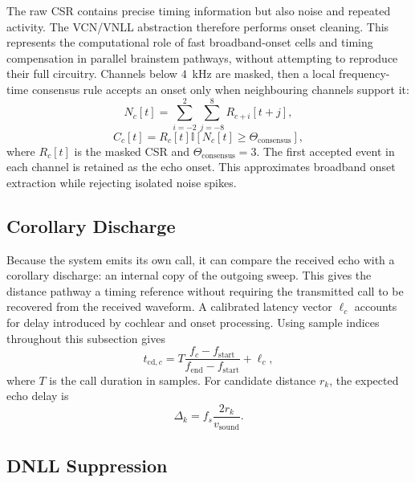 The raw CSR contains precise timing information but also noise and repeated activity. The VCN/VNLL abstraction therefore performs onset cleaning. This represents the computational role of fast broadband-onset cells and timing compensation in parallel brainstem pathways, without attempting to reproduce their full circuitry. Channels below $4$~kHz are masked, then a local frequency-time consensus rule accepts an onset only when neighbouring channels support it:
\begin{equation}
    N_c[t] = \sum_{i=-2}^{2}\sum_{j=-8}^{8} R_{c+i}[t+j],
\end{equation}
\begin{equation}
    C_c[t] = R_c[t]\mathbb{I}[N_c[t]\geq \Theta_{\mathrm{consensus}}],
\end{equation}
where $R_c[t]$ is the masked CSR and $\Theta_{\mathrm{consensus}}=3$. The first accepted event in each channel is retained as the echo onset. This approximates broadband onset extraction while rejecting isolated noise spikes.

\subsection{Corollary Discharge}

Because the system emits its own call, it can compare the received echo with a corollary discharge: an internal copy of the outgoing sweep. This gives the distance pathway a timing reference without requiring the transmitted call to be recovered from the received waveform. A calibrated latency vector $\ell_c$ accounts for delay introduced by cochlear and onset processing. Using sample indices throughout this subsection gives
\begin{equation}
    t_{\mathrm{cd},c}
    =
    T\frac{f_c-f_{\mathrm{start}}}{f_{\mathrm{end}}-f_{\mathrm{start}}}
    + \ell_c,
\end{equation}
where $T$ is the call duration in samples. For candidate distance $r_k$, the expected echo delay is
\begin{equation}
    \Delta_k = f_s\frac{2r_k}{v_{\mathrm{sound}}}.
\end{equation}

\subsection{DNLL Suppression}

